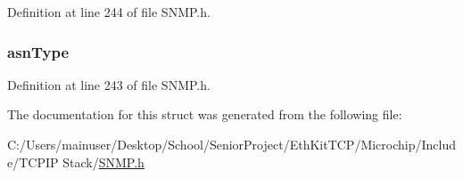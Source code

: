 Definition at line 244 of file S\+N\+M\+P.\+h.

\hypertarget{struct_d_a_t_a___t_y_p_e___i_n_f_o_acfc7c9a225080cbf50b0b6ad249349f9}{}
\subsubsection[{asn\+Type}]{ asn\+Type}\label{struct_d_a_t_a___t_y_p_e___i_n_f_o_acfc7c9a225080cbf50b0b6ad249349f9}


Definition at line 243 of file S\+N\+M\+P.\+h.



The documentation for this struct was generated from the following file\+:\begin{DoxyCompactItemize}
\item 
C\+:/\+Users/mainuser/\+Desktop/\+School/\+Senior\+Project/\+Eth\+Kit\+T\+C\+P/\+Microchip/\+Include/\+T\+C\+P\+I\+P Stack/\hyperlink{_s_n_m_p_8h}{S\+N\+M\+P.\+h}\end{DoxyCompactItemize}
